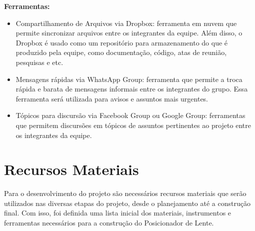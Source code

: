 \textbf{Ferramentas:}

\begin{itemize}
\item Compartilhamento de Arquivos via Dropbox: ferramenta em nuvem que permite sincronizar arquivos entre os integrantes da equipe. Além disso, o Dropbox é usado como um repositório para armazenamento do que é produzido pela equipe, como documentação, código, atas de reunião, pesquisas e etc.
\item Mensagens rápidas via WhatsApp Group: ferramenta que permite a troca rápida e barata de mensagens informais entre os integrantes do grupo. Essa ferramenta será utilizada para avisos e assuntos mais urgentes.
\item Tópicos para discursão via Facebook Group ou Google Group: ferramentas que permitem discursões em tópicos de assuntos pertinentes ao projeto entre os integrantes da equipe.
\end{itemize}


\section[Recursos Materiais]{Recursos Materiais}

Para o desenvolvimento do projeto são necessários recursos materiais que serão utilizados nas diversas etapas do projeto, desde o planejamento até a construção final. Com isso, foi definida uma lista inicial dos materiais, instrumentos e ferramentas necessários para a construção do Posicionador de Lente.

